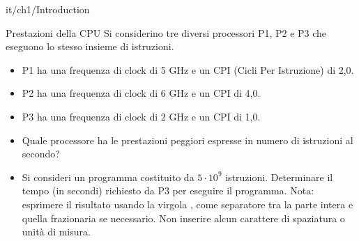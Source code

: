 \documentclass[11pt]{article}
\begin{document}
\begin{quiz}{it/ch1/Introduction}
\begin{cloze}[points=1,shuffle=false]{Prestazioni della CPU}
    Si considerino tre diversi processori P1, P2 e P3 che eseguono lo stesso insieme di istruzioni. 
    \begin{itemize}
        \item P1 ha una frequenza di clock di 5 GHz e un CPI (Cicli Per Istruzione) di 2,0. 
        \item P2 ha una frequenza di clock di 6 GHz e un CPI di 4,0.
        \item P3 ha una frequenza di clock di 2 GHz e un CPI di 1,0.
    \end{itemize}
    \begin{itemize}
    \item Quale processore ha le prestazioni peggiori espresse in numero di istruzioni al secondo? 
    \item Si consideri un programma costituito da $5\cdot10^9$ istruzioni. Determinare il tempo (in secondi) richiesto da P3 per eseguire il programma.     
    Nota: esprimere il risultato usando la virgola , come separatore tra la parte intera e quella frazionaria se necessario. Non inserire alcun carattere di spaziatura o unità di misura.
    \end{itemize}
\end{cloze}


\end{quiz}
\end{document}
